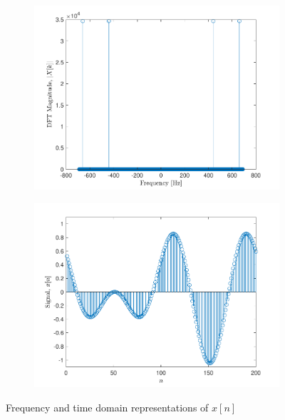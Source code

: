 \documentclass[10pt]{article}
\begin{document}
\begin{figure}[ht]
    \centering
    \begin{subfigure}[b]{0.48\textwidth}
        \includegraphics[width=\textwidth]{problem1_fft.pdf}
    \end{subfigure}
    \quad
    \begin{subfigure}[b]{0.48\textwidth}
        \includegraphics[width=\textwidth]{problem1_sig.pdf}
    \end{subfigure}
    \caption{Frequency and time domain representations of $x[n]$\vspace{-0.5cm}}
    \label{freq_domain_design_for_time_domain_signal}
\end{figure}
\end{document}
